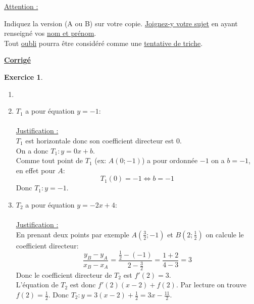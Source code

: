 \documentclass{exam}
\theoremstyle{definition}
\newtheorem{exercice}{Exercice}
\begin{document}
    \begin{tcolorbox}
        \Large
        \begin{center}
            \underline{Attention :}
        \end{center}
        \vspace{-0.5em}
        Indiquez la version (A ou B) sur votre copie. \underline{Joignez-y votre sujet} en ayant renseigné vos \underline{nom et prénom}.\\
        Tout \underline{oubli} pourra être considéré comme une \underline{tentative de triche}.
    \end{tcolorbox}

\newpage

\begin{center}
    \LARGE
    \textbf{\underline{Corrigé}}
\end{center}
\setcounter{exercice}{0}

\begin{exercice}
    \begin{enumerate}
        \item[]
        \item $T_1$ a pour équation $y = -1$:\\
        \\
        \underline{Justification :}\\
        $T_1$ est horizontale donc son coefficient directeur est $0$.\\
        On a donc $T_1: y = 0x + b$.\\
        Comme tout point de $T_1$ (ex: $A(0; -1)$) a pour ordonnée $-1$ on a $b = -1$, en effet pour $A$:
        $$
            T_1(0) = -1 \iff b = -1
        $$
        Donc $T_1: y = -1$.
        \item $T_2$ a pour équation $y = -2x + 4$:\\
        \\
        \underline{Justification :}\\
        En prenant deux points par exemple $A(\frac{3}{2}; -1)$ et $B(2; \frac{1}{2})$ on calcule le coefficient directeur:
        $$
            \frac{y_B - y_A}{x_B - x_A} = \frac{\frac{1}{2} - (-1)}{2 - \frac{3}{2}} = \frac{1 + 2}{4 - 3} = 3
        $$
        Donc le coefficient directeur de $T_2$ est $f'(2) = 3$.\\
        L'équation de $T_2$ est donc $f'(2)(x-2) + f(2)$. Par lecture on trouve $f(2) = \frac{1}{2}$.
        Donc $T_2: y = 3(x-2) + \frac{1}{2} = 3x - \frac{11}{2}$.
    \end{enumerate}
\end{exercice}
\end{document}
